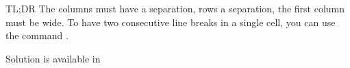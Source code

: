 \begin{infobox}{TL;DR}
The columns must have a \snippet{8pt} separation, rows a \snippet{6pt} separation, the first column must be \snippet{2cm} wide. To have two consecutive line breaks in a single cell, you can use the command \snippet{\textbackslash\textbackslash[1em]}.

Solution is available in 
\end{infobox}